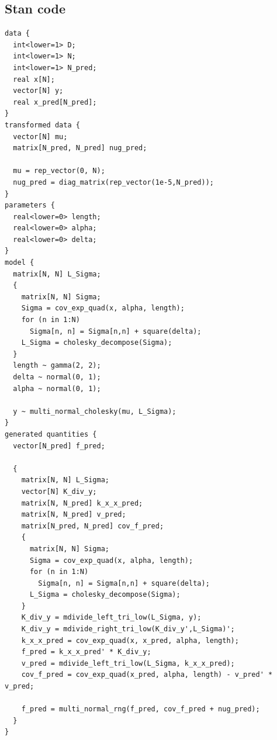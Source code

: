 \documentclass{article}
\begin{document}
\pagebreak

\subsection{Stan code}

\begin{verbatim}
data {
  int<lower=1> D;
  int<lower=1> N;
  int<lower=1> N_pred;
  real x[N];
  vector[N] y;
  real x_pred[N_pred];
}
transformed data {
  vector[N] mu;
  matrix[N_pred, N_pred] nug_pred;

  mu = rep_vector(0, N);
  nug_pred = diag_matrix(rep_vector(1e-5,N_pred));
}
parameters {
  real<lower=0> length;
  real<lower=0> alpha;
  real<lower=0> delta;
}
model {
  matrix[N, N] L_Sigma;
  {
    matrix[N, N] Sigma;
    Sigma = cov_exp_quad(x, alpha, length);
    for (n in 1:N)
      Sigma[n, n] = Sigma[n,n] + square(delta);
    L_Sigma = cholesky_decompose(Sigma);
  }
  length ~ gamma(2, 2);
  delta ~ normal(0, 1);
  alpha ~ normal(0, 1);

  y ~ multi_normal_cholesky(mu, L_Sigma);
}
generated quantities {
  vector[N_pred] f_pred;

  {
    matrix[N, N] L_Sigma;
    vector[N] K_div_y;
    matrix[N, N_pred] k_x_x_pred;
    matrix[N, N_pred] v_pred;
    matrix[N_pred, N_pred] cov_f_pred;
    {
      matrix[N, N] Sigma;
      Sigma = cov_exp_quad(x, alpha, length);
      for (n in 1:N)
        Sigma[n, n] = Sigma[n,n] + square(delta);
      L_Sigma = cholesky_decompose(Sigma);
    }
    K_div_y = mdivide_left_tri_low(L_Sigma, y);
    K_div_y = mdivide_right_tri_low(K_div_y',L_Sigma)';
    k_x_x_pred = cov_exp_quad(x, x_pred, alpha, length);
    f_pred = k_x_x_pred' * K_div_y; 
    v_pred = mdivide_left_tri_low(L_Sigma, k_x_x_pred);
    cov_f_pred = cov_exp_quad(x_pred, alpha, length) - v_pred' * v_pred;

    f_pred = multi_normal_rng(f_pred, cov_f_pred + nug_pred);
  }
}
\end{verbatim}




\end{document}
